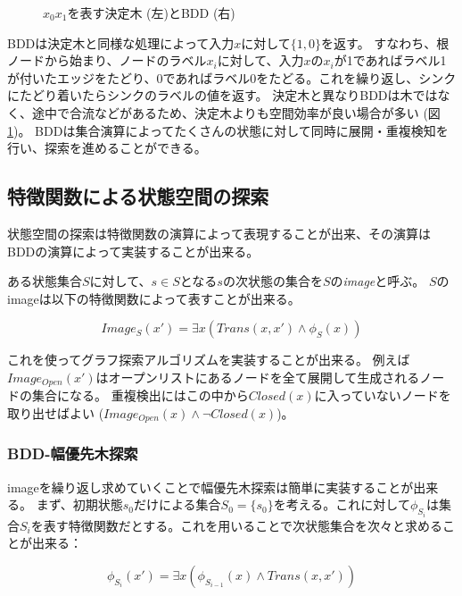 \begin{figure}
  \centering
  \begin{tikzpicture}[scale=0.6]
    
  \end{tikzpicture}
  \caption{$x_0 x_1$を表す決定木 (左)とBDD (右)}
  \label{fig:bdd}
\end{figure}

BDDは決定木と同様な処理によって入力$x$に対して$\{1, 0\}$を返す。
すなわち、根ノードから始まり、ノードのラベル$x_i$に対して、入力$x$の$x_i$が1であればラベル1が付いたエッジをたどり、0であればラベル0をたどる。これを繰り返し、シンクにたどり着いたらシンクのラベルの値を返す。
決定木と異なりBDDは木ではなく、途中で合流などがあるため、決定木よりも空間効率が良い場合が多い (図\ref{fig:bdd})。
BDDは集合演算によってたくさんの状態に対して同時に展開・重複検知を行い、探索を進めることができる。



\subsection{特徴関数による状態空間の探索}

状態空間の探索は特徴関数の演算によって表現することが出来、その演算はBDDの演算によって実装することが出来る。

ある状態集合$S$に対して、$s \in S$となる$s$の次状態の集合を$S$の{\it image}と呼ぶ。
$S$のimageは以下の特徴関数によって表すことが出来る。

\begin{equation}
	Image_S(x') = \exists x (Trans(x,x') \land \phi_S(x))
\end{equation}

これを使ってグラフ探索アルゴリズムを実装することが出来る。
例えば$Image_{Open}(x')$はオープンリストにあるノードを全て展開して生成されるノードの集合になる。
重複検出にはこの中から$Closed(x)$に入っていないノードを取り出せばよい ($Image_{Open}(x) \land \lnot Closed(x)$)。

\subsubsection{BDD-幅優先木探索}

imageを繰り返し求めていくことで幅優先木探索は簡単に実装することが出来る。
まず、初期状態$s_0$だけによる集合$S_0 = \{s_0\}$を考える。これに対して$\phi_{S_{i}}$は集合$S_i$を表す特徴関数だとする。これを用いることで次状態集合を次々と求めることが出来る：

\begin{equation}
	\phi_{S_i}(x') = \exists x (\phi_{S_{i-1}}(x) \land Trans(x,x'))
\end{equation}

